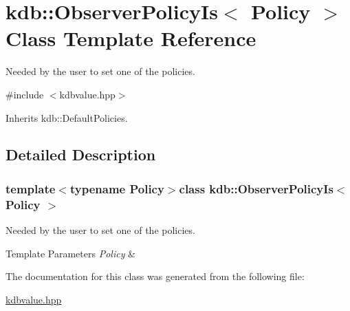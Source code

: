 \hypertarget{classkdb_1_1ObserverPolicyIs}{\section{kdb\+:\+:Observer\+Policy\+Is$<$ Policy $>$ Class Template Reference}
\label{classkdb_1_1ObserverPolicyIs}
}


Needed by the user to set one of the policies.  




{\ttfamily \#include $<$kdbvalue.\+hpp$>$}



Inherits kdb\+::\+Default\+Policies.



\subsection{Detailed Description}
\subsubsection*{template$<$typename Policy$>$class kdb\+::\+Observer\+Policy\+Is$<$ Policy $>$}

Needed by the user to set one of the policies. 


\begin{DoxyTemplParams}{Template Parameters}
{\em Policy} & \\
\hline
\end{DoxyTemplParams}


The documentation for this class was generated from the following file\+:\begin{DoxyCompactItemize}
\item 
\hyperlink{kdbvalue_8hpp}{kdbvalue.\+hpp}\end{DoxyCompactItemize}

